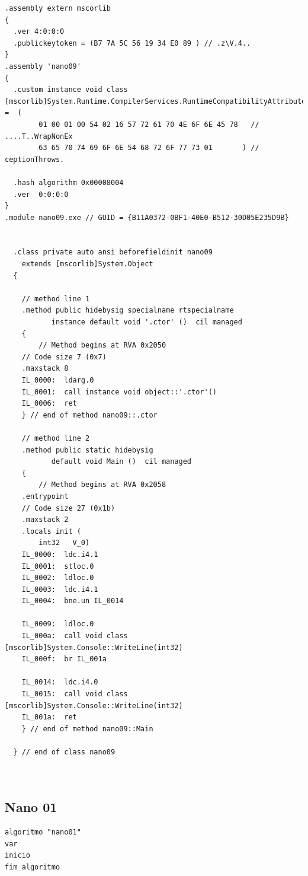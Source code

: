 \documentclass[hidelinks,12pt]{article}
\begin{document}
\begin{lstlisting}[caption=Atribuição de duas operações aritméticas sobre inteiros a uma variável(Código em CIL gerado pelo comando monodis)]
.assembly extern mscorlib
{
  .ver 4:0:0:0
  .publickeytoken = (B7 7A 5C 56 19 34 E0 89 ) // .z\V.4..
}
.assembly 'nano09'
{
  .custom instance void class [mscorlib]System.Runtime.CompilerServices.RuntimeCompatibilityAttribute::'.ctor'() =  (
		01 00 01 00 54 02 16 57 72 61 70 4E 6F 6E 45 78   // ....T..WrapNonEx
		63 65 70 74 69 6F 6E 54 68 72 6F 77 73 01       ) // ceptionThrows.

  .hash algorithm 0x00008004
  .ver  0:0:0:0
}
.module nano09.exe // GUID = {B11A0372-0BF1-40E0-B512-30D05E235D9B}


  .class private auto ansi beforefieldinit nano09
  	extends [mscorlib]System.Object
  {

    // method line 1
    .method public hidebysig specialname rtspecialname 
           instance default void '.ctor' ()  cil managed 
    {
        // Method begins at RVA 0x2050
	// Code size 7 (0x7)
	.maxstack 8
	IL_0000:  ldarg.0 
	IL_0001:  call instance void object::'.ctor'()
	IL_0006:  ret 
    } // end of method nano09::.ctor

    // method line 2
    .method public static hidebysig 
           default void Main ()  cil managed 
    {
        // Method begins at RVA 0x2058
	.entrypoint
	// Code size 27 (0x1b)
	.maxstack 2
	.locals init (
		int32	V_0)
	IL_0000:  ldc.i4.1 
	IL_0001:  stloc.0 
	IL_0002:  ldloc.0 
	IL_0003:  ldc.i4.1 
	IL_0004:  bne.un IL_0014

	IL_0009:  ldloc.0 
	IL_000a:  call void class [mscorlib]System.Console::WriteLine(int32)
	IL_000f:  br IL_001a

	IL_0014:  ldc.i4.0 
	IL_0015:  call void class [mscorlib]System.Console::WriteLine(int32)
	IL_001a:  ret 
    } // end of method nano09::Main

  } // end of class nano09



\end{lstlisting}


\subsection{Nano 01}
	
	\begin{lstlisting}[caption=Módulo mínimo que caracteriza um programa (Portugol)]
algoritmo "nano01"
var
inicio
fim_algoritmo
	\end{lstlisting}
\end{document}
